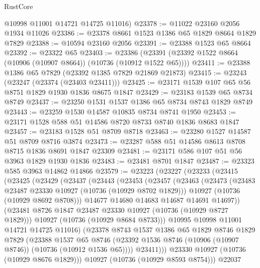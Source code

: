 \begin{lexlean}{RustCore}
\begin{coremodule}
      @10998
      @11001
      @14721
      @14725
      @11016)
@23378 := @11022 @23160 @2056 @1934 @11026
@23386 := @23378 @8661 @1523 @1386 @65 @1829 @8664 @1829 @7829
@23388 := @10594 @23160 @2056
@23391 := @23388 @1523 @65 @8664
@23392 := @23322 @65
@23403 := @23386 (@23391 (@23392 @1522 @8664 (@10906 (@10907 @8664)) (@10736 (@10912 @1522 @65))))
@23411 := @23388 @1386 @65 @7829 (@23392 @1385 @7829 @21869 @21873)
@23415 := @23243 (@23247 (@23374 (@23403 @23411)))
@23425 := @23171 @1539 @107 @65 @56 @8751 @1829 @1930 @1836 @8675 @1847
@23429 := @23183 @1539 @65 @8734 @8749
@23437 := @23250 @1531 @1537 @1386 @65 @8734 @8743 @1829 @8749
@23443 := @23259 @1530 @14587 @10835 @8734 @8741 @1950
@23453 := @23171 @1528 @588 @51 @14586 @8720 @8733 @8740 @1836 @8683 @1847
@23457 := @23183 @1528 @51 @8709 @8718
@23463 := @23280 @1527 @14587 @51 @8709 @8716 @3874
@23473 := @23287 @588 @51 @14586 @8613 @8708 @8715 @1836 @8691 @1847 @23309
@23481 := @23171 @586 @107 @51 @56 @3963 @1829 @1930 @1836
@23483 := @23481 @8701 @1847
@23487 := @23323 @585 @3963 @14862 @14866
@23579 := @23223
    (@23227
      (@23233
        (@23415
          (@23425
            (@23429
              (@23437
                (@23443
                  (@23453
                    (@23457
                      (@23463
                        (@23473
                          (@23483 @23487 @23330 @10927 (@10736 (@10929 @8702 @1829)))
                          @10927
                          (@10736 (@10929 @8692 @8708)))
                        @14677
                        @14680
                        @14683
                        @14687
                        @14691
                        @14697))
                    (@23481 @8726 @1847 @23487 @23330 @10927 (@10736 (@10929 @8727 @1829)))
                    @10927
                    (@10736 (@10929 @8684 @8733)))
                  @10995
                  @10998
                  @11001
                  @14721
                  @14725
                  @11016)
                (@23378
                  @8743
                  @1537
                  @1386
                  @65
                  @1829
                  @8746
                  @1829
                  @7829
                  (@23388
                    @1537
                    @65
                    @8746
                    (@23392 @1536 @8746 (@10906 (@10907 @8746)) (@10736 (@10912 @1536 @65))))
                  @23411)))
            @23330
            @10927
            (@10736 (@10929 @8676 @1829)))
          @10927
          (@10736 (@10929 @8593 @8754)))
        @22037

\end{coremodule}
\end{lexlean}
